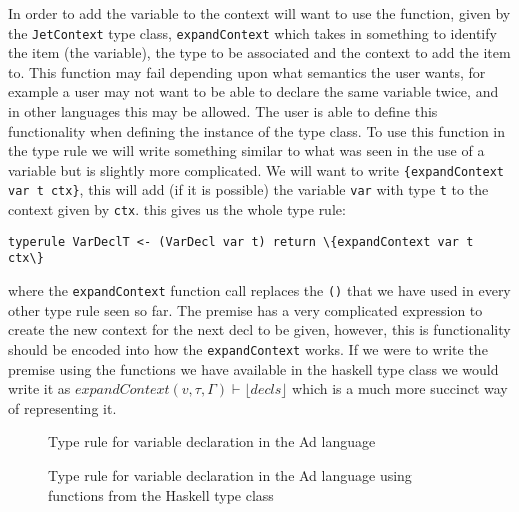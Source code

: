 In order to add the variable to the context will want to use the function, given by the \texttt{JetContext} type class, \texttt{expandContext} which takes in something to identify the item (the variable), the type to be associated and the context to add the item to.
This function may fail depending upon what semantics the user wants, for example a user may not want to be able to declare the same variable twice, and in other languages this may be allowed.
The user is able to define this functionality when defining the instance of the type class.
To use this function in the type rule we will write something similar to what was seen in the use of a variable but is slightly more complicated.
We will want to write \texttt{\{expandContext var t ctx\}}, this will add (if it is possible) the variable \texttt{var} with type \texttt{t} to the context given by \texttt{ctx}.
this gives us the whole type rule:
\begin{lstlisting}[numbers=none]
typerule VarDeclT <- (VarDecl var t) return \{expandContext var t ctx\}
\end{lstlisting}
where the \texttt{expandContext} function call replaces the \texttt{()} that we have used in every other type rule seen so far.
The premise has a very complicated expression to create the new context for the next decl to be given, however, this is functionality should be encoded into how the \texttt{expandContext} works.
If we were to write the premise using the functions we have available in the haskell type class we would write it as $expandContext(v,\tau,\Gamma) \vdash \lfloor decls \rfloor$ which is a much more succinct way of representing it.

\begin{figure}
    \begin{prooftree}
    \end{prooftree}
    \caption{Type rule for variable declaration in the Ad language}
    \label{fig:varDeclTypeRule}
\end{figure}

\begin{figure}
    \begin{prooftree}
    \end{prooftree}
    \caption{Type rule for variable declaration in the Ad language using functions from the Haskell type class}
    \label{fig:modvarDeclTypeRule}
\end{figure}

